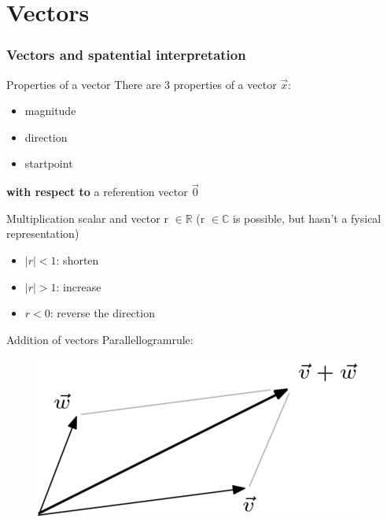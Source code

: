 \section{Vectors}

\begin{frame}
	\frametitle{Vectors and spatential interpretation}
	\begin{block}{Properties of a vector}
		There are 3 properties of a vector $\overrightarrow{x}$:
		\begin{itemize}
			\item magnitude
			\item direction
			\item startpoint
		\end{itemize}
		{\bf with respect to} a referention vector $\overrightarrow{0}$
	\end{block}
\end{frame}

\begin{frame}
	\begin{block}{Multiplication scalar and vector}
		r $\in \mathbb{R}$ (r $\in \mathbb{C}$ is possible, but hasn't a fysical representation)
		\begin{itemize}
			\item $|r|<1$: shorten
			\item $|r|>1$: increase
			\item $r<0$: reverse the direction
		\end{itemize}
	\end{block}
	\begin{block}{Addition of vectors}
		Parallellogramrule:

		\begin{figure}
			\centering
			\includegraphics[width=0.4\linewidth]{optelling}
		\end{figure}
	\end{block} 
\end{frame}

